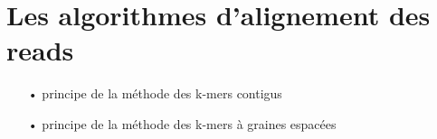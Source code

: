 \section{Les algorithmes d'alignement des reads}

	\begin{itemize}
		\item[•] principe de la méthode des k-mers contigus
		\item[•] principe de la méthode des k-mers à graines espacées 
	\end{itemize}